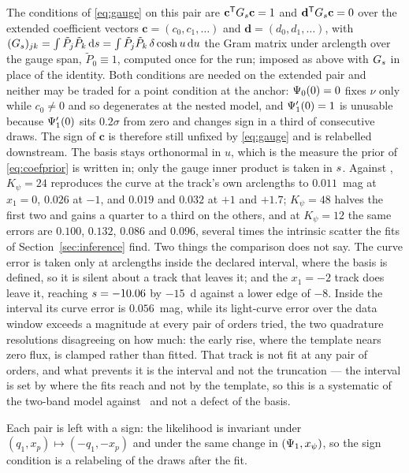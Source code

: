 \documentclass[11pt]{article}
\theoremstyle{plain}
\begin{document}
The conditions of \eqref{eq:gauge} on this pair are
$\mathbf{c}^{\mathsf T}G_{s}\mathbf{c} = 1$ and
$\mathbf{d}^{\mathsf T}G_{s}\mathbf{c} = 0$ over the extended coefficient vectors
$\mathbf{c} = (c_{0}, c_{1}, \ldots)$ and $\mathbf{d} = (d_{0}, d_{1}, \ldots)$, with
$(G_{s})_{jk} = \int \tilde P_{j}\tilde P_{k}\,\mathrm{d}s = \int \tilde P_{j}\tilde P_{k}\,\delta\cosh u\,\mathrm{d} u$
the Gram matrix under arclength over the gauge span, $\tilde P_{0} \equiv 1$, computed once
for the run; imposed as above with $G_{s}$ in place of the identity. Both conditions are
needed on the extended pair and neither may be traded for a point condition at the anchor:
$\Psi_{0}(0) = 0$ fixes $\nu$ only while $c_{0} \neq 0$ and so degenerates at the nested
model, and $\Psi_{1}'(0) = 1$ is unusable because $\Psi_{1}'(0)$ sits $0.2\sigma$ from zero
and changes sign in a third of consecutive draws. The sign of $\mathbf{c}$ is therefore
still unfixed by \eqref{eq:gauge} and is relabelled downstream. The basis stays orthonormal in $u$, which
is the measure the prior of \eqref{eq:coefprior} is written in; only the gauge inner
product is taken in $s$. Against \salt, $K_{\psi} = 24$ reproduces the curve at the track's own arclengths to
$0.011$~mag at $x_{1} = 0$, $0.026$ at $-1$, and $0.019$ and $0.032$ at $+1$ and $+1.7$;
$K_{\psi} = 48$ halves the first two and gains a quarter to a third on the others, and at
$K_{\psi} = 12$ the same errors are $0.100$, $0.132$, $0.086$ and $0.096$, several times
the intrinsic scatter the fits of Section~\ref{sec:inference} find. Two things the
comparison does not say. The curve error is taken only at arclengths inside the declared
interval, where the basis is defined, so it is silent about a track that leaves it; and the
$x_{1} = -2$ track does leave it, reaching $s = -10.06$ by $-15$~d against a lower edge
of $-8$. Inside the interval its curve error is $0.056$~mag, while its light-curve error
over the data window exceeds a magnitude at every pair of orders tried, the two quadrature
resolutions disagreeing on how much: the early rise, where the template nears zero flux, is
clamped rather than fitted. That track is not fit at any pair of orders, and what prevents
it is the interval and not the truncation --- the interval is set by where the fits reach
and not by the template, so this is a systematic of the two-band model against \salt\ and
not a defect of the basis.

Each pair is left with a sign:
the likelihood is invariant under $(q_{1}, x_p) \mapsto (-q_{1}, -x_p)$ and under the same
change in $(\Psi_{1}, x_{\psi})$, so the sign condition is a relabeling of the draws
after the fit.
\end{document}
